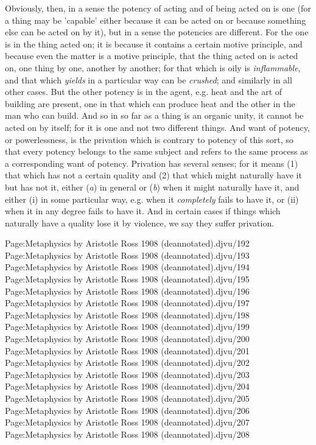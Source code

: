 Obviously, then, in a sense the potency of acting and of being acted on is one (for a thing may be 'capable' either because it can be acted on or because something else can be acted on by it), but in a sense the potencies are different. For the one is in the thing acted on; it is because it contains a certain motive principle, and because even the matter is a motive principle, that the thing acted on is acted on, one thing by one, another by another; for that which is oily is \emph{inflammable}, and that which \emph{yields} in a particular way can be \emph{crushed}; and similarly in all other cases. But the other potency is in the agent, e.g. heat and the art of building are present, one in that which can produce heat and the other in the man who can build. And so in so far as a thing is an organic unity, it cannot be acted on by itself; for it is one and not two different things. And want of potency, or powerlessness, is the privation which is contrary to potency of this sort, so that every potency belongs to the same subject and refers to the same process as a corresponding want of potency. Privation has several senses; for it means (1) that which has not a certain quality and (2) that which might naturally have it but has not it, either (\emph{a}) in general or (\emph{b}) when it might naturally have it, and either (i) in some particular way, e.g. when it \emph{completely} fails to have it, or (ii) when it in any degree fails to have it. And in certain cases if things which naturally have a quality lose it by violence, we say they suffer privation.

Page:Metaphysics by Aristotle Ross 1908 (deannotated).djvu/192 Page:Metaphysics by Aristotle Ross 1908 (deannotated).djvu/193 Page:Metaphysics by Aristotle Ross 1908 (deannotated).djvu/194 Page:Metaphysics by Aristotle Ross 1908 (deannotated).djvu/195 Page:Metaphysics by Aristotle Ross 1908 (deannotated).djvu/196 Page:Metaphysics by Aristotle Ross 1908 (deannotated).djvu/197 Page:Metaphysics by Aristotle Ross 1908 (deannotated).djvu/198 Page:Metaphysics by Aristotle Ross 1908 (deannotated).djvu/199 Page:Metaphysics by Aristotle Ross 1908 (deannotated).djvu/200 Page:Metaphysics by Aristotle Ross 1908 (deannotated).djvu/201 Page:Metaphysics by Aristotle Ross 1908 (deannotated).djvu/202 Page:Metaphysics by Aristotle Ross 1908 (deannotated).djvu/203 Page:Metaphysics by Aristotle Ross 1908 (deannotated).djvu/204 Page:Metaphysics by Aristotle Ross 1908 (deannotated).djvu/205 Page:Metaphysics by Aristotle Ross 1908 (deannotated).djvu/206 Page:Metaphysics by Aristotle Ross 1908 (deannotated).djvu/207 Page:Metaphysics by Aristotle Ross 1908 (deannotated).djvu/208

